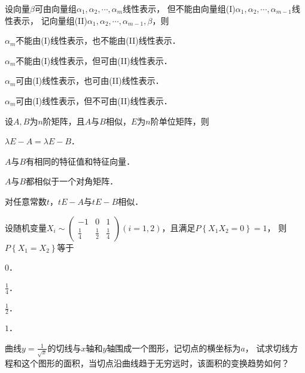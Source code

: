 \documentclass[plain,noanswer,medmath]{../../template/jnuexam}
\begin{document}
\begin{problem}
设向量$\beta$可由向量组$\alpha_1,\alpha_2, \cdots ,\alpha_m$线性表示，
但不能由向量组(I)$\alpha_1,\alpha_2, \cdots ,\alpha_{m - 1}$线性表示，
记向量组(II)$\alpha_1,\alpha_2, \cdots ,\alpha_{m - 1},\beta$，则 \pickout{}
\begin{abcd}
\item $\alpha_m$不能由(I)线性表示，也不能由(II)线性表示．
\item $\alpha_m$不能由(I)线性表示，但可由(II)线性表示．
\item $\alpha_m$可由(I)线性表示，也可由(II)线性表示．
\item $\alpha_m$可由(I)线性表示，但不可由(II)线性表示．
\end{abcd}
\end{problem}


\begin{problem}
设$A,B$为$n$阶矩阵，且$A$与$B$相似，$E$为$n$阶单位矩阵，则\pickout{}
\begin{abcd}
\item $\lambda E - A = \lambda E - B$．
\item $A$与$B$有相同的特征值和特征向量．
\item $A$与$B$都相似于一个对角矩阵．
\item 对任意常数$t$，$tE - A$与$tE - B$相似．
\end{abcd}
\end{problem}


\begin{problem}
设随机变量$X_i \sim \begin{pmatrix}
           -1 &           0 & 1 \\
  \frac{1}{4} & \frac{1}{2} & \frac{1}{4}
\end{pmatrix}(i = 1,2)$，且满足$P\left\{X_1X_2 = 0 \right\} = 1$，
则$P\left\{X_1 = X_2 \right\}$等于\pickout{}
\begin{abcd}
\item $0$．
\item $\frac{1}{4}$．
\item $\frac{1}{2}$．
\item $1$．
\end{abcd}
\end{problem}



\begin{problem}
曲线$y = \frac{1}{\sqrt{x}}$的切线与$x$轴和$y$轴围成一个图形，记切点的横坐标为$a$，
试求切线方程和这个图形的面积，当切点沿曲线趋于无穷远时，该面积的变换趋势如何？
\end{problem}
\end{document}
